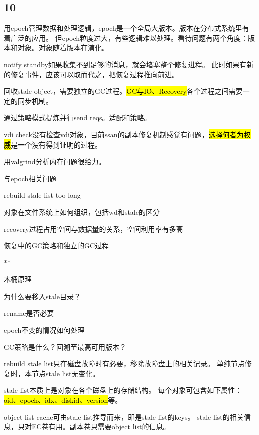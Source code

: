 \subsection{10}

用epoch管理数据和处理逻辑，epoch是一个全局大版本。版本在分布式系统里有着广泛的应用。
但epoch粒度过大，有些逻辑难以处理。看待问题有两个角度：版本和对象。对象随着版本在演化。

notify standby如果收集不到足够的消息，就会堵塞整个修复进程。
此时如果有新的修复事件，应该可以取而代之，把恢复过程推向前进。

回收stale object，需要独立的GC过程。\hl{GC与IO、Recovery}各个过程之间需要一定的同步机制。

通过策略模式提炼并行send reqs。适配和策略。

vdi check没有检查vdi对象，目前ssan的副本修复机制感觉有问题，\hl{选择何者为权威}是一个没有得到证明的过程。

用valgrind分析内存问题很给力。

与epoch相关问题
\begin{enumbox}
\item rebuild stale list too long
\item 对象在文件系统上如何组织，包括wd和stale的区分
\item recovery过程占用空间与数据量的关系，空间利用率有多高
\item 恢复中的GC策略和独立的GC过程
\item ***
\item 木桶原理
\end{enumbox}

\hrulefill

\begin{enumbox}
\item 为什么要移入stale目录？
\item rename是否必要
\item epoch不变的情况如何处理
\item GC策略是什么？回溯至最高可用版本？
\end{enumbox}

rebuild stale list只在磁盘故障时有必要，移除故障盘上的相关记录。
单纯节点修复时，本节点stale list无变化。

stale list本质上是对象在各个磁盘上的存储结构。
每个对象可包含如下属性：\hl{oid、epoch、idx、diskid、version}等。

object list cache可由stale list推导而来，即是stale list的keys。
stale list的相关信息，只对EC卷有用。副本卷只需要object list的信息。


